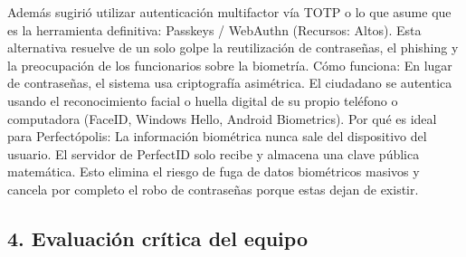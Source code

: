 Además sugirió utilizar autenticación multifactor vía TOTP o lo que asume que es la herramienta definitiva:
Passkeys / WebAuthn (Recursos: Altos). Esta alternativa resuelve de un solo golpe la reutilización de contraseñas, el phishing y la preocupación de los funcionarios sobre la biometría. Cómo funciona: En lugar de contraseñas, el sistema usa criptografía asimétrica. El ciudadano se autentica usando el reconocimiento facial o huella digital de su propio teléfono o computadora (FaceID, Windows Hello, Android Biometrics).
Por qué es ideal para Perfectópolis: La información biométrica nunca sale del dispositivo del usuario. El servidor de PerfectID solo recibe y almacena una clave pública matemática. Esto elimina el riesgo de fuga de datos biométricos masivos y cancela por completo el robo de contraseñas porque estas dejan de existir.
\subsection*{4. Evaluación crítica del equipo}

